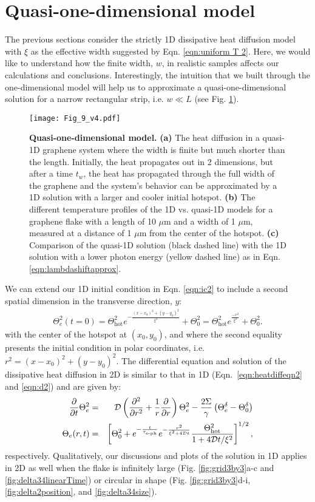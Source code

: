 \documentclass[aip, amsmath,amssymb, reprint]{revtex4-1}
\newcommand{\ba}{\begin{eqnarray}}
\newcommand{\ea}{\end{eqnarray}}
\begin{document}
\section{Quasi-one-dimensional model}\label{sec:quasi1d}
The previous sections consider the strictly 1D dissipative heat diffusion model with $\xi$ as the effective width suggested by Eqn. \ref{eqn:uniform T 2}. Here, we would like to understand how the finite width, $w$, in realistic samples affects our calculations and conclusions. Interestingly, the intuition that we built through the one-dimensional model will help us to approximate a quasi-one-dimensional solution for a narrow rectangular strip, i.e. $w \ll L$ (see Fig. \ref{fig:2Dto1D}).

\begin{figure}[h]\centering
\texttt{[image: Fig\_9\_v4.pdf]}
\caption{\textbf{Quasi-one-dimensional model.} \textbf{(a)} The heat diffusion in a quasi-1D graphene system where the width is finite but much shorter than the length. Initially, the heat propagates out in 2 dimensions, but after a time $t_w$, the heat has propagated through the full width of the graphene and the system's behavior can be approximated by a 1D solution with a larger and cooler initial hotspot. \textbf{(b)} The different temperature profiles of the 1D vs. quasi-1D models for a graphene flake with a length of 10 $\mu$m and a width of 1 $\mu$m, measured at a distance of 1 $\mu$m from the center of the hotspot. \textbf{(c)} Comparison of the quasi-1D solution (black dashed line) with the 1D solution with a lower photon energy (yellow dashed line) as in Eqn. \ref{eqn:lambdashiftapprox}.}
\label{fig:2Dto1D}
\end{figure}

We can extend our 1D initial condition in Eqn. \ref{eqn:ic2} to include a second spatial dimension in the transverse direction, $y$:
\ba \Theta_e^2(t=0)= \Theta_{\text{hot}}^2 e^{-\frac{(x-x_0)^2+(y-y_0)^2}{\xi^2}}+\Theta_0^2 = \Theta_{\text{hot}}^2 e^{\frac{-r^2}{\xi^2}}+\Theta_0^2.\label{eqn:2DinitialCondition}\ea with the center of the hotspot at $(x_0,y_0)$, and where the second equality presents the initial condition in polar coordinates, i.e.\ $r^2 = (x-x_0)^2+(y-y_0)^2$. The differential equation and solution of the dissipative heat diffusion in 2D is similar to that in 1D (Eqn.\ \ref{eqn:heatdiffeqn2} and \ref{eqn:d2}) and are given by:
\ba\frac{\partial}{\partial t} \Theta_e^2 &=& \mathcal{D}\left(\frac{\partial^2}{\partial r^2}+\frac{1}{r}\frac{\partial}{\partial r}\right)\Theta_e^2 - \frac{2\Sigma}{\gamma}\left( \Theta_{e}^{\delta} - \Theta_0^{\delta} \right) \label{eqn:heatdiffeqn_2d_a}\\
\Theta_e(r, t) &=& \left[\Theta_0^2+e^{-\frac{t}{\tau_{\text{e-ph}}}}e^{-\frac{r^2}{\xi^2+4\mathcal{D}t}}\frac{\Theta^2_{\rm{hot}}}{1+4\mathcal{D}t/\xi^2}\right]^{1/2}\label{eqn:d2_in_2D},\ea respectively. Qualitatively, our discussions and plots of the solution in 1D applies in 2D as well when the flake is infinitely large (Fig. \ref{fig:grid3by3}a-c and \ref{fig:delta34linearTime}) or circular in shape (Fig. \ref{fig:grid3by3}d-i, \ref{fig:delta2position}, and \ref{fig:delta34size}).
\end{document}

